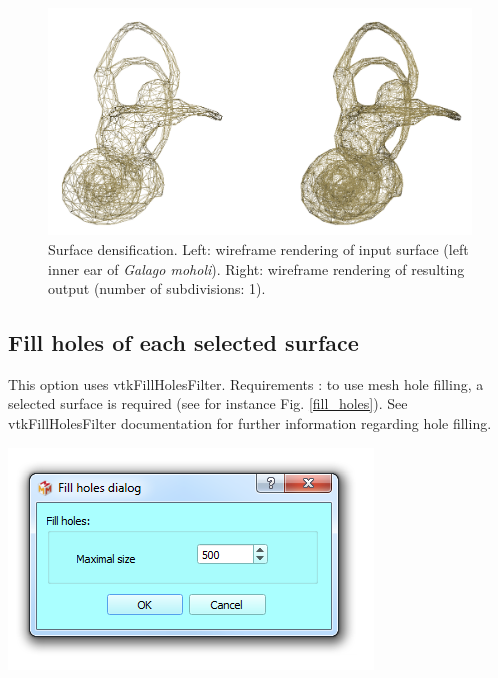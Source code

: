 \begin{figure}
  \centering
  \includegraphics[scale=0.35]{images/09/structure/densification_example.png} 
	\caption{Surface densification. Left: wireframe rendering of input surface (left inner ear of \textit{Galago moholi}). Right: wireframe rendering of resulting output (number of subdivisions: 1).
}
\label{densify}
 
\end{figure}




\subsection{Fill holes of each selected surface}

\noindent
\begin{minipage}{0.5\textwidth}

This option uses vtkFillHolesFilter.
Requirements : to use mesh hole filling, a selected surface is
required (see for instance Fig. \ref{fill_holes}). See vtkFillHolesFilter documentation for further
information regarding hole filling.


\end{minipage}    
\begin{minipage}{0.5\textwidth}\centering
  \includegraphics[scale=0.5]{images/09/structure/fill_holes_dialog.png}
 \end{minipage} 
\noindent

